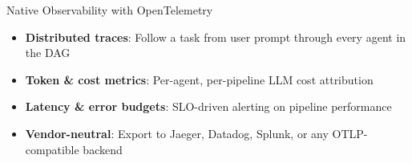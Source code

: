 \begin{frame}{Native Observability with OpenTelemetry}
\begin{center}
  \end{center}
  \vspace{-0.3cm}
  \scriptsize
  \begin{itemize}
    \item \textbf{Distributed traces}: Follow a task from user prompt through every agent in the DAG
    \item \textbf{Token \& cost metrics}: Per-agent, per-pipeline LLM cost attribution
    \item \textbf{Latency \& error budgets}: SLO-driven alerting on pipeline performance
    \item \textbf{Vendor-neutral}: Export to Jaeger, Datadog, Splunk, or any OTLP-compatible backend
  \end{itemize}
\end{frame}
